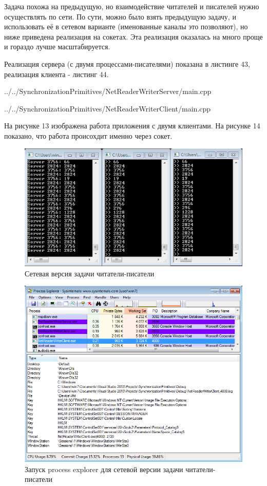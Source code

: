 \documentclass[a4paper, 12pt]{article}		%
\begin{document}
Задача похожа на предыдущую, но взаимодействие читателей и писателей нужно осуществлять по сети. По сути, можно было взять предыдущую задачу, и использовать её в сетевом варианте (именованные каналы это позволяют), но ниже приведена реализация на сокетах. Эта реализация оказалась на много проще и гораздо лучше масштабируется.

Реализация сервера (с двумя процессами-писателями) показана в листинге 43, реализация клиента - листинг 44.


{../../SynchronizationPrimitives/NetReaderWriterServer/main.cpp}


{../../SynchronizationPrimitives/NetReaderWriterClient/main.cpp}

На рисунке 13 изображена работа приложения с двумя клиентами. На рисунке 14 показано, что работа происохдит именно через сокет.
\newpage

\begin{figure}[h!]
\centering
\includegraphics[scale=0.7]{res/013}
\caption{Сетевая версия задачи читатели-писатели}
\end{figure}

\begin{figure}[h!]
\centering
\includegraphics[scale=0.6]{res/pe_13}
\caption{Запуск process explorer для сетевой версии задачи читатели-писатели}
\end{figure}
\end{document}
